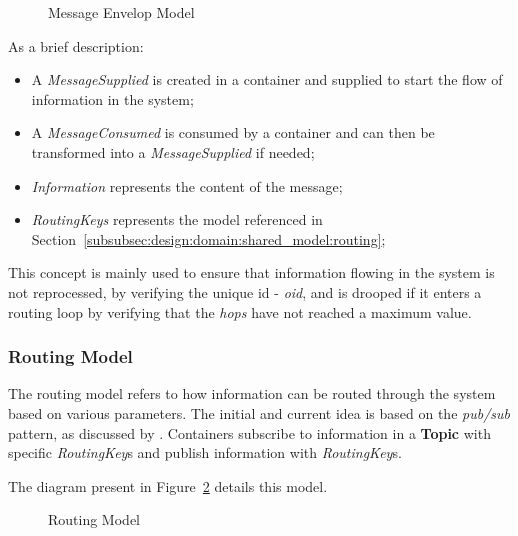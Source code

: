 \begin{figure}[H]
   \centering
  \resizebox{\columnwidth}{!}
  {
     
  }
  \caption[Message Envelop Model]{Message Envelop Model}
  \label{fig:design:domain:shared_model:messsage:diagram}
\end{figure}

As a brief description:

\begin{itemize}
   \item A \textit{MessageSupplied} is created in a container and supplied to start the flow of information in the system;
   \item A \textit{MessageConsumed} is consumed by a container and can then be transformed into a \textit{MessageSupplied} if needed;
   \item \textit{Information} represents the content of the message;
   \item \textit{RoutingKeys} represents the model referenced in Section~\ref{subsubsec:design:domain:shared_model:routing};
\end{itemize}

This concept is mainly used to ensure that information flowing in the system is not reprocessed, by verifying the unique id - \textit{oid}, and is drooped if it enters a routing loop by verifying that the \textit{hops} have not reached a maximum value.  

\subsubsection*{Routing Model}
\label{subsubsec:design:domain:shared_model:routing}

The routing model refers to how information can be routed through the system based on various parameters. The initial and current idea is based on the \textit{pub/sub} pattern, as discussed by \cite{urquhart2021flow}. Containers subscribe to information in a \textbf{Topic} with specific \textit{RoutingKey}s and publish information with \textit{RoutingKey}s.

The diagram present in Figure~\ref{fig:design:domain:shared_model:routing:diagram} details this model.

\begin{figure}[H]
   \centering
  \resizebox{\columnwidth}{!}
  {
     
  }
  \caption[Routing Model]{Routing Model}
  \label{fig:design:domain:shared_model:routing:diagram}
\end{figure}

